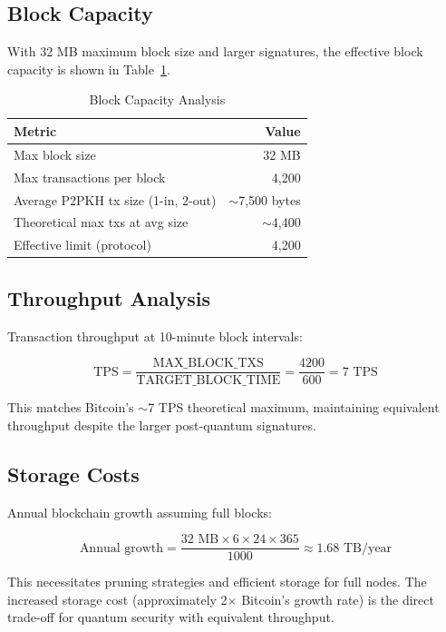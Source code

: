 \documentclass[11pt,a4paper]{article}
\begin{document}
\subsection{Block Capacity}

With 32 MB maximum block size and larger signatures, the effective block capacity is shown in Table~\ref{tab:block-capacity}.

\begin{table}[ht]
\centering
\caption{Block Capacity Analysis}
\label{tab:block-capacity}
\begin{tabular}{@{}lr@{}}
\toprule
Metric & Value \\
\midrule
Max block size & 32 MB \\
Max transactions per block & 4,200 \\
Average P2PKH tx size (1-in, 2-out) & $\sim$7,500 bytes \\
Theoretical max txs at avg size & $\sim$4,400 \\
Effective limit (protocol) & 4,200 \\
\bottomrule
\end{tabular}
\end{table}

\subsection{Throughput Analysis}

Transaction throughput at 10-minute block intervals:

\begin{equation}
\text{TPS} = \frac{\text{MAX\_BLOCK\_TXS}}{\text{TARGET\_BLOCK\_TIME}} = \frac{4200}{600} = 7 \text{ TPS}
\end{equation}

This matches Bitcoin's $\sim$7 TPS theoretical maximum, maintaining equivalent throughput despite the larger post-quantum signatures.

\subsection{Storage Costs}

Annual blockchain growth assuming full blocks:

\begin{equation}
\text{Annual growth} = \frac{32 \text{ MB} \times 6 \times 24 \times 365}{1000} \approx 1.68 \text{ TB/year}
\end{equation}

This necessitates pruning strategies and efficient storage for full nodes. The increased storage cost (approximately 2$\times$ Bitcoin's growth rate) is the direct trade-off for quantum security with equivalent throughput.
\end{document}
